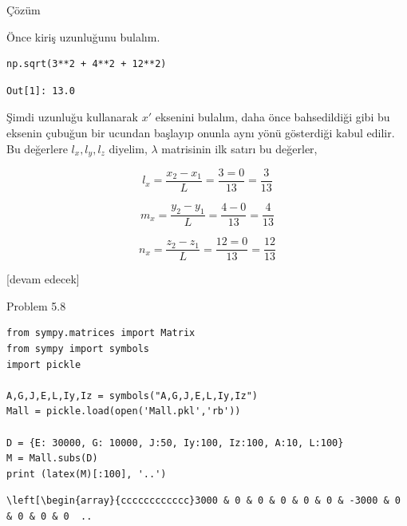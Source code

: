 \documentclass[12pt,fleqn]{article}\usepackage{../../common}
\begin{document}
Çözüm

Önce kiriş uzunluğunu bulalım.

\begin{verbatim}
np.sqrt(3**2 + 4**2 + 12**2)
\end{verbatim}

\begin{verbatim}
Out[1]: 13.0
\end{verbatim}

Şimdi uzunluğu kullanarak $x'$ eksenini bulalım, daha önce bahsedildiği gibi bu
eksenin çubuğun bir ucundan başlayıp onunla aynı yönü gösterdiği kabul edilir.
Bu değerlere $l_x,l_y,l_z$ diyelim, $\lambda$ matrisinin ilk satırı bu değerler,

$$
l_x = \frac{x_2 - x_1}{L} = \frac{3 = 0}{13} = \frac{3}{13}
$$

$$
m_x = \frac{y_2 - y_1}{L} = \frac{4-0}{13} = \frac{4}{13}
$$

$$
n_x = \frac{z_2 - z_1}{L} = \frac{12 = 0}{13} = \frac{12}{13}
$$














[devam edecek]

Problem 5.8

\begin{verbatim}
from sympy.matrices import Matrix
from sympy import symbols
import pickle

A,G,J,E,L,Iy,Iz = symbols("A,G,J,E,L,Iy,Iz")
Mall = pickle.load(open('Mall.pkl','rb'))

D = {E: 30000, G: 10000, J:50, Iy:100, Iz:100, A:10, L:100}
M = Mall.subs(D)
print (latex(M)[:100], '..')
\end{verbatim}

\begin{verbatim}
\left[\begin{array}{cccccccccccc}3000 & 0 & 0 & 0 & 0 & 0 & -3000 & 0 & 0 & 0 & 0  ..
\end{verbatim}
\end{document}
